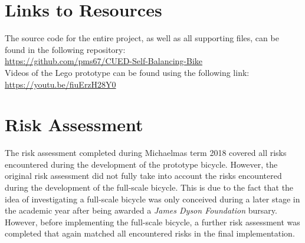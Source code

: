 \begin{appendices}
\section{Links to Resources}
The source code for the entire project, as well as all supporting files, can be found in the following repository: \\
\url{https://github.com/pms67/CUED-Self-Balancing-Bike} \\

Videos of the Lego prototype can be found using the following link: \\
\url{https://youtu.be/fiuErzH28Y0}

\section{Risk Assessment}
The risk assessment completed during Michaelmas term 2018 covered all risks encountered during the development of the prototype bicycle. However, the original risk assessment did not fully take into account the risks encountered during the development of the full-scale bicycle. This is due to the fact that the idea of investigating a full-scale bicycle was only conceived during a later stage in the academic year after being awarded a \textit{James Dyson Foundation} bursary. However, before implementing the full-scale bicycle, a further risk assessment was completed that again matched all encountered risks in the final implementation.
\end{appendices}
